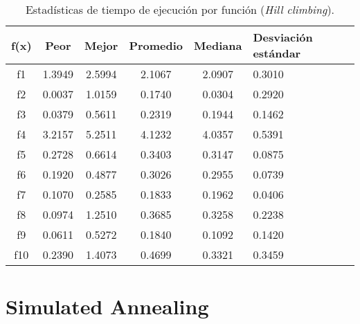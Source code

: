 \documentclass[12pt,twoside]{report}
\begin{document}
	
	\begin{table}[H]
		\centering
		\begin{tabular}{|c|c|c|c|c|p{2.1cm}|}  
			\hline
			\textbf{f(x)} & \textbf{Peor} & \textbf{Mejor} & \textbf{Promedio} & \textbf{Mediana} & \textbf{Desviación estándar} \\  
			\hline
			f1 & 1.3949 & 2.5994 & 2.1067 & 2.0907 & 0.3010 \\
			f2 & 0.0037 & 1.0159 & 0.1740 & 0.0304 & 0.2920 \\
			f3 & 0.0379 & 0.5611 & 0.2319 & 0.1944 & 0.1462 \\
			f4 & 3.2157 & 5.2511 & 4.1232 & 4.0357 & 0.5391 \\
			f5 & 0.2728 & 0.6614 & 0.3403 & 0.3147 & 0.0875 \\
			f6 & 0.1920 & 0.4877 & 0.3026 & 0.2955 & 0.0739 \\
			f7 & 0.1070 & 0.2585 & 0.1833 & 0.1962 & 0.0406 \\
			f8 & 0.0974 & 1.2510 & 0.3685 & 0.3258 & 0.2238 \\
			f9 & 0.0611 & 0.5272 & 0.1840 & 0.1092 & 0.1420 \\
			f10 & 0.2390 & 1.4073 & 0.4699 & 0.3321 & 0.3459 \\
			\hline
		\end{tabular}
		\caption{Estadísticas de tiempo de ejecución por función (\textit{Hill climbing}).}
		\label{tab:time_hc}
	\end{table}
	
	
	\section{Simulated Annealing}
	
\end{document}

